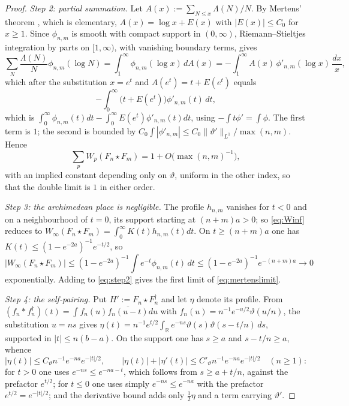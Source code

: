 \documentclass[11pt]{amsart}
\theoremstyle{definition}
\theoremstyle{remark}
\newcommand{\R}{\mathbb R}
\begin{document}
\begin{proof}
\emph{Step 2: partial summation.}  Let $A(x):=\sum_{N\le x}\Lambda(N)/N$.  By
Mertens' theorem \cite{Mertens}, which is elementary, $A(x)=\log x+E(x)$ with
$|E(x)|\le C_0$ for $x\ge1$.  Since $\phi_{n,m}$ is smooth with compact support
in $(0,\infty)$, Riemann--Stieltjes integration by parts on $[1,\infty)$, with
vanishing boundary terms, gives
\[
\sum_N\frac{\Lambda(N)}{N}\phi_{n,m}(\log N)
=\int_1^{\infty}\phi_{n,m}(\log x)\,dA(x)
=-\int_1^{\infty}A(x)\,\phi'_{n,m}(\log x)\,\frac{dx}{x} ,
\]
which after the substitution $x=e^{t}$ and $A(e^{t})=t+E(e^{t})$ equals
\[
-\int_0^{\infty}\bigl(t+E(e^{t})\bigr)\phi'_{n,m}(t)\,dt ,
\]
which is $\int_0^{\infty}\phi_{n,m}(t)dt-\int_0^{\infty}E(e^{t})
\phi'_{n,m}(t)dt$, using $-\int t\phi'=\int\phi$.  The first term is $1$; the
second is bounded by $C_0\int|\phi'_{n,m}|\le
C_0\lVert\vartheta'\rVert_{L^{1}}/\max(n,m)$.  Hence
\begin{equation}\label{eq:step2}
\sum_pW_p(F_n\star F_m)=1+O\bigl(\max(n,m)^{-1}\bigr),
\end{equation}
with an implied constant depending only on $\vartheta$, uniform in the other index,
so that the double limit is $1$ in either order.

\emph{Step 3: the archimedean place is negligible.}  The profile $h_{n,m}$
vanishes for $t<0$ and on a neighbourhood of $t=0$, its support starting at
$(n+m)a>0$; so \eqref{eq:Winf} reduces to $W_{\infty}(F_n\star
F_m)=\int_0^{\infty}K(t)h_{n,m}(t)dt$.  On $t\ge(n+m)a$ one has
$K(t)\le(1-e^{-2a})^{-1}e^{-t/2}$, so
\[
|W_{\infty}(F_n\star F_m)|\le(1-e^{-2a})^{-1}\int
e^{-t}\phi_{n,m}(t)\,dt\le(1-e^{-2a})^{-1}e^{-(n+m)a}\longrightarrow0
\]
exponentially.  Adding to \eqref{eq:step2} gives the first limit of
\eqref{eq:mertenslimit}.

\emph{Step 4: the self-pairing.}  Put $H':=F_n\star F_n^{\dagger}$ and let $\eta$ denote its profile.  From
$(f_n*f_n^{\dagger})(t)=\int f_n(u)\overline{f_n(u-t)}du$ with
$f_n(u)=n^{-1}e^{-u/2}\vartheta(u/n)$, the substitution $u=ns$ gives
$\eta(t)=n^{-1}e^{t/2}\int_{\R}e^{-ns}\vartheta(s)\vartheta(s-t/n)\,ds$, supported in
$|t|\le n(b-a)$.  On the support one has $s\ge a$ and $s-t/n\ge a$, whence
\begin{equation}\label{eq:hprime}
|\eta(t)|\le C_{\vartheta}n^{-1}e^{-na}e^{-|t|/2},\qquad
|\eta(t)|+|\eta'(t)|\le C'_{\vartheta}n^{-1}e^{-na}e^{-|t|/2}\quad(n\ge1):
\end{equation}
for $t>0$ one uses $e^{-ns}\le e^{-na-t}$, which follows from $s\ge a+t/n$,
against the prefactor $e^{t/2}$; for $t\le0$ one uses simply $e^{-ns}\le
e^{-na}$ with the prefactor $e^{t/2}=e^{-|t|/2}$; and the derivative bound adds
only $\tfrac12\eta$ and a term carrying $\vartheta'$.


\end{proof}
\end{document}
